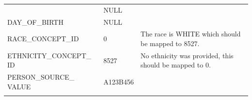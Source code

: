 \documentclass[10.5pt]{book}
\theoremstyle{definition}
\theoremstyle{definition}
\theoremstyle{definition}
\theoremstyle{remark}
\begin{document}
\begin{longtable}[]{@{}lll@{}}
\begin{minipage}[t]{0.23\columnwidth}
\end{minipage} & \begin{minipage}[t]{0.16\columnwidth}\raggedright\strut
NULL\strut
\end{minipage} & \begin{minipage}[t]{0.32\columnwidth}\raggedright\strut
\strut
\end{minipage}\tabularnewline
\begin{minipage}[t]{0.23\columnwidth}\raggedright\strut
DAY\_OF\_BIRTH\strut
\end{minipage} & \begin{minipage}[t]{0.16\columnwidth}\raggedright\strut
NULL\strut
\end{minipage} & \begin{minipage}[t]{0.32\columnwidth}\raggedright\strut
\strut
\end{minipage}\tabularnewline
\begin{minipage}[t]{0.23\columnwidth}\raggedright\strut
RACE\_CONCEPT\_ID\strut
\end{minipage} & \begin{minipage}[t]{0.16\columnwidth}\raggedright\strut
0\strut
\end{minipage} & \begin{minipage}[t]{0.32\columnwidth}\raggedright\strut
The race is WHITE which should be mapped to 8527.\strut
\end{minipage}\tabularnewline
\begin{minipage}[t]{0.23\columnwidth}\raggedright\strut
ETHNICITY\_CONCEPT\_ ID\strut
\end{minipage} & \begin{minipage}[t]{0.16\columnwidth}\raggedright\strut
8527\strut
\end{minipage} & \begin{minipage}[t]{0.32\columnwidth}\raggedright\strut
No ethnicity was provided, this should be mapped to 0.\strut
\end{minipage}\tabularnewline
\begin{minipage}[t]{0.23\columnwidth}\raggedright\strut
PERSON\_SOURCE\_ VALUE\strut
\end{minipage} & \begin{minipage}[t]{0.16\columnwidth}\raggedright\strut
A123B456\strut
\end{minipage} & \begin{minipage}[t]{0.32\columnwidth}\raggedright\strut
\strut
\end{minipage}\tabularnewline
\begin{minipage}[t]{0.23\columnwidth}\raggedright\strut

\end{minipage}
\end{longtable}
\end{document}
